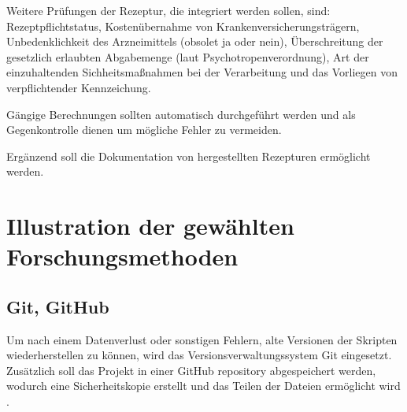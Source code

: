 \documentclass[12pt,a4paper]{article}
\begin{document}

Weitere Prüfungen der Rezeptur, die integriert werden sollen, sind: Rezeptpflichtstatus, Kostenübernahme von Krankenversicherungsträgern, Unbedenklichkeit des Arzneimittels (obsolet ja oder nein), Überschreitung der gesetzlich erlaubten Abgabemenge (laut Psychotropenverordnung), Art der einzuhaltenden Sichheitsmaßnahmen bei der Verarbeitung und das Vorliegen von verpflichtender Kennzeichung.



Gängige Berechnungen sollten automatisch durchgeführt werden und als Gegenkontrolle dienen um mögliche Fehler zu vermeiden.


Ergänzend soll die Dokumentation von hergestellten Rezepturen ermöglicht werden.








\section{Illustration der gewählten Forschungsmethoden}

\subsection{Git, GitHub}

Um nach einem Datenverlust oder sonstigen Fehlern, alte Versionen der Skripten wiederherstellen zu können, wird das Versionsverwaltungssystem Git eingesetzt. Zusätzlich soll das Projekt in einer GitHub repository abgespeichert werden, wodurch eine Sicherheitskopie erstellt und das Teilen der Dateien ermöglicht wird \cite{Blischak.2016}. 
% 
\end{document}
